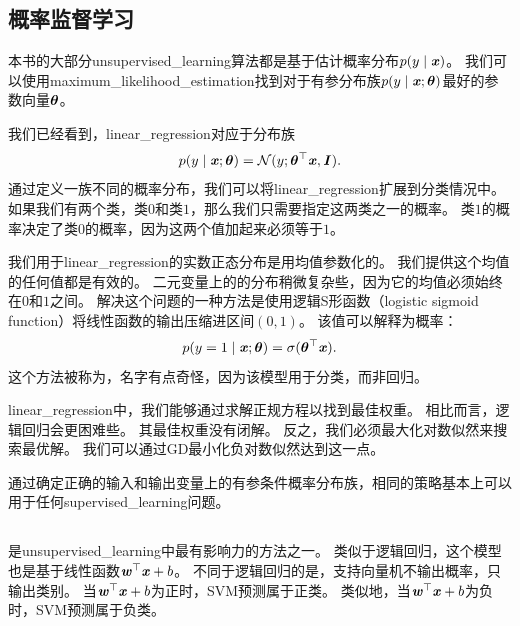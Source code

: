 
\subsection{概率监督学习}
\label{sec:probabilistic_supervised_learning}
本书的大部分\gls{unsupervised_learning}算法都是基于估计概率分布$p(y\mid\boldsymbol{\mathit{x}})$。
我们可以使用\gls{maximum_likelihood_estimation}找到对于有参分布族$p(y\mid\boldsymbol{\mathit{x}};\boldsymbol{\theta})$最好的参数向量$\boldsymbol{\theta}$。 

我们已经看到，\gls{linear_regression}对应于分布族
\begin{equation}
    p(y \mid \boldsymbol{\mathit{x}}; \boldsymbol{\theta}) = \mathcal{N}( y; \boldsymbol{\theta}^\top \boldsymbol{\mathit{x}}, \boldsymbol{\mathit{I}}).
\end{equation}
通过定义一族不同的概率分布，我们可以将\gls{linear_regression}扩展到分类情况中。
如果我们有两个类，类$0$和类$1$，那么我们只需要指定这两类之一的概率。
类$1$的概率决定了类$0$的概率，因为这两个值加起来必须等于$1$。

我们用于\gls{linear_regression}的实数正态分布是用均值参数化的。
我们提供这个均值的任何值都是有效的。
二元变量上的的分布稍微复杂些，因为它的均值必须始终在$0$和$1$之间。
解决这个问题的一种方法是使用逻辑S形函数（logistic sigmoid function）将线性函数的输出压缩进区间$(0,1)$。
该值可以解释为概率：
\begin{equation}
    p(y = 1 \mid \boldsymbol{\mathit{x}}; \boldsymbol{\theta}) = \sigma(\boldsymbol{\theta}^\top \boldsymbol{\mathit{x}}).
\end{equation}
这个方法被称为，名字有点奇怪，因为该模型用于分类，而非回归。

\gls{linear_regression}中，我们能够通过求解正规方程以找到最佳权重。
相比而言，逻辑回归会更困难些。
其最佳权重没有闭解。
反之，我们必须最大化对数似然来搜索最优解。
我们可以通过\gls{GD}最小化负对数似然达到这一点。

通过确定正确的输入和输出变量上的有参条件概率分布族，相同的策略基本上可以用于任何\gls{supervised_learning}问题。

\subsection{}
\label{sec:support_vector_machines}
是\gls{unsupervised_learning}中最有影响力的方法之一\citep{Boser92,Cortes95}。
类似于逻辑回归，这个模型也是基于线性函数$\boldsymbol{\mathit{w}}^\top \boldsymbol{\mathit{x}} + b$。
不同于逻辑回归的是，支持向量机不输出概率，只输出类别。
当$\boldsymbol{\mathit{w}}^\top\boldsymbol{\mathit{x}} + b$为正时，\gls{SVM}预测属于正类。
类似地，当$\boldsymbol{\mathit{w}}^\top\boldsymbol{\mathit{x}} + b$为负时，\gls{SVM}预测属于负类。


